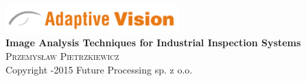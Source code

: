 \newcommand{\coverPage}[3]
{
	\begin{titlingpage}
	\begin{center}


	\includegraphics[width=0.50\textwidth]{./logo}\\[5cm]    





	{ \huge \bfseries #2}\\[0.4cm]

	\textsc{\Large #1}\\[0.5cm]
	\null
	\vfill
	{\small #3}
	\end{center}
	\end{titlingpage}



	\thispagestyle{empty}	
	\newpage
}


\coverPage
{Przemys\l aw Pietrzkiewicz}
{Image Analysis Techniques for Industrial Inspection Systems}
{Copyright \textcopyright 2012-2015 Future Processing sp. z o.o.}
